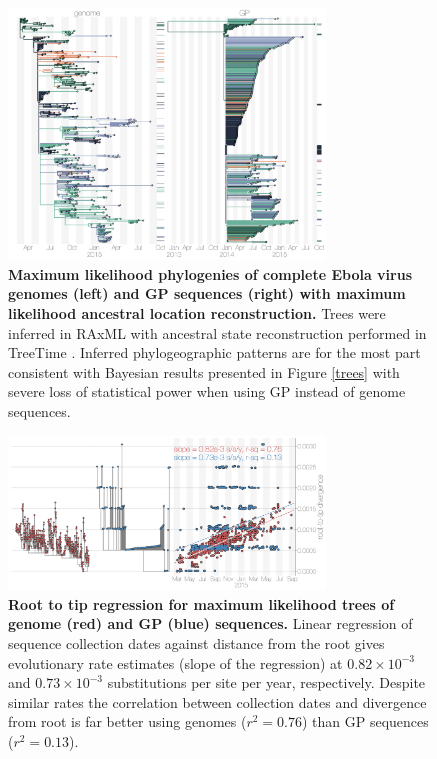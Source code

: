 \documentclass[11pt,oneside,letterpaper]{article}
\begin{document}
\begin{figure}[h]
 \centering
	\includegraphics[width=0.75\textwidth]{supp_figures/sfigX_treetimeTrees.png}
	\caption{\textbf{Maximum likelihood phylogenies of complete Ebola virus genomes (left) and GP sequences (right) with maximum likelihood ancestral location reconstruction.}
  Trees were inferred in RAxML \citep{stamatakis_raxml_2014} with ancestral state reconstruction performed in TreeTime \citep{sagulenko_treetime:_2018}.
  Inferred phylogeographic patterns are for the most part consistent with Bayesian results presented in Figure \ref{trees} with severe loss of statistical power when using GP instead of genome sequences.
	}
	\label{TTtrees}
\end{figure}

\begin{figure}[h]
 \centering
	\includegraphics[width=0.75\textwidth]{supp_figures/sfigX_rtt.png}
	\caption{\textbf{Root to tip regression for maximum likelihood trees of genome (red) and GP (blue) sequences.}
  Linear regression of sequence collection dates against distance from the root gives evolutionary rate estimates (slope of the regression) at $0.82\times10^{-3}$ and $0.73\times10^{-3}$ substitutions per site per year, respectively.
  Despite similar rates the correlation between collection dates and divergence from root is far better using genomes ($r^{2}=0.76$) than GP sequences ($r^{2}=0.13$).
	}
	\label{rtt}
\end{figure}
\end{document}
